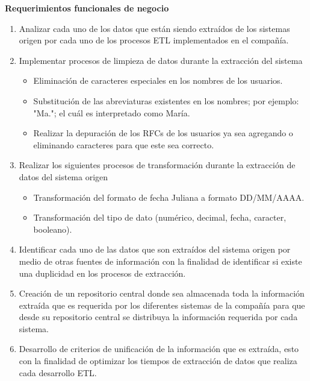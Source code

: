 \textbf{Requerimientos funcionales de negocio}

\begin{enumerate}

\item Analizar cada uno de los datos que están siendo extraídos de los sistemas
  origen por cada uno de los procesos ETL implementados en el compañía.

\item Implementar procesos de limpieza de datos durante la extracción del
  sistema

  \begin {itemize}
  \item Eliminación de caracteres especiales en los nombres de los usuarios.
  \item Substitución de las abreviaturas existentes en los nombres; por ejemplo:
    "Ma."; el cuál es interpretado como María.
  \item Realizar la depuración de los RFCs de los usuarios ya sea agregando o
    eliminando caracteres para que este sea correcto.
  \end{itemize}

\item Realizar los siguientes procesos de transformación durante la extracción
  de datos del sistema origen

  \begin {itemize}
  \item Transformación del formato de fecha Juliana a formato DD/MM/AAAA.
  \item Transformación del tipo de dato (numérico, decimal, fecha, caracter,
    booleano).
  \end{itemize}

\item Identificar cada uno de las datos que son extraídos del sistema origen por
  medio de otras fuentes de información con la finalidad de identificar si
  existe una duplicidad en los procesos de extracción.

\item Creación de un repositorio central donde sea almacenada toda la
  información extraída que es requerida por los diferentes sistemas de la
  compañía para que desde su repositorio central se distribuya la información
  requerida por cada sistema.

\item Desarrollo de criterios de unificación de la información que es extraída,
  esto con la finalidad de optimizar los tiempos de extracción de datos que
  realiza cada desarrollo ETL.


\end{enumerate}
